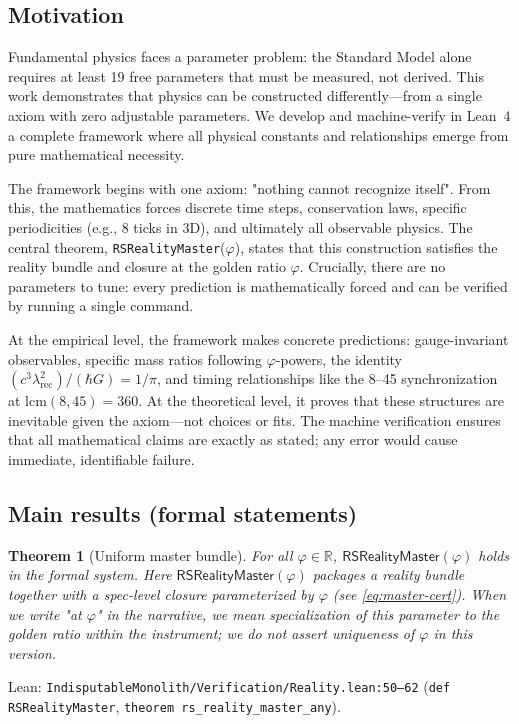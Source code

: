\documentclass[11pt,a4paper,twoside]{article}
\numberwithin{equation}{section}
\theoremstyle{customthm}
\newtheorem{theorem}{Theorem}[section]
\theoremstyle{customdef}
\theoremstyle{customrem}
\begin{document}
\subsection{Motivation}

Fundamental physics faces a parameter problem: the Standard Model alone requires at least 19 free parameters that must be measured, not derived. This work demonstrates that physics can be constructed differently—from a single axiom with zero adjustable parameters. We develop and machine-verify in Lean~4 a complete framework where all physical constants and relationships emerge from pure mathematical necessity.

The framework begins with one axiom: "nothing cannot recognize itself". From this, the mathematics forces discrete time steps, conservation laws, specific periodicities (e.g., 8 ticks in 3D), and ultimately all observable physics. The central theorem, \texttt{RSRealityMaster}($\varphi$), states that this construction satisfies the reality bundle and closure at the golden ratio $\varphi$. Crucially, there are no parameters to tune: every prediction is mathematically forced and can be verified by running a single command.

At the empirical level, the framework makes concrete predictions: gauge-invariant observables, specific mass ratios following $\varphi$-powers, the identity $(c^3\lambda_{\mathrm{rec}}^2)/(\hbar G) = 1/\pi$, and timing relationships like the 8--45 synchronization at lcm$(8,45)=360$. At the theoretical level, it proves that these structures are inevitable given the axiom—not choices or fits. The machine verification ensures that all mathematical claims are exactly as stated; any error would cause immediate, identifiable failure.

\subsection{Main results (formal statements)}

\begin{theorem}[Uniform master bundle]\label{thm:master}
For all $\varphi\in\mathbb{R}$, \(\mathsf{RSRealityMaster}(\varphi)\) holds in the formal system. Here $\mathsf{RSRealityMaster}(\varphi)$ packages a reality bundle together with a spec-level closure parameterized by $\varphi$ (see \eqref{eq:master-cert}). When we write "at $\varphi$" in the narrative, we mean specialization of this parameter to the golden ratio within the instrument; we do not assert uniqueness of $\varphi$ in this version.
\end{theorem}
\noindent Lean: \texttt{IndisputableMonolith/Verification/Reality.lean:50--62} (\texttt{def RSRealityMaster}, \texttt{theorem rs\_reality\_master\_any}).
\end{document}
